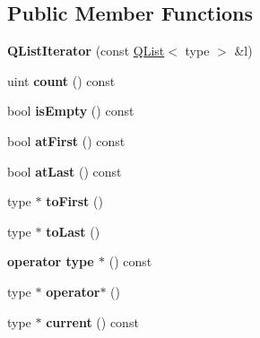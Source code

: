 \subsection*{Public Member Functions}
\begin{DoxyCompactItemize}
\item 
\mbox{\label{class_q_list_iterator_a826bd77b3505d0e9bc43971660b598e3}} 
{\bfseries Q\+List\+Iterator} (const \mbox{\hyperlink{class_q_list}{Q\+List}}$<$ type $>$ \&l)
\item 
\mbox{\label{class_q_list_iterator_a1595299ccfd5497632bd85c544b86240}} 
uint {\bfseries count} () const
\item 
\mbox{\label{class_q_list_iterator_ae4dc91934aaf9eb9ef330b2a7797bcfe}} 
bool {\bfseries is\+Empty} () const
\item 
\mbox{\label{class_q_list_iterator_a6b9fbd5a72609cea1d9abaa4cc0747a1}} 
bool {\bfseries at\+First} () const
\item 
\mbox{\label{class_q_list_iterator_a71ae9f0a1391720ca61931dd40a73c24}} 
bool {\bfseries at\+Last} () const
\item 
\mbox{\label{class_q_list_iterator_a2c526dad2cc4158567c56d18329cb6f5}} 
type $\ast$ {\bfseries to\+First} ()
\item 
\mbox{\label{class_q_list_iterator_a1470808c16e884e0a5c8a184be6f100a}} 
type $\ast$ {\bfseries to\+Last} ()
\item 
\mbox{\label{class_q_list_iterator_a3e70ab66f800982ff724f0e53302e957}} 
{\bfseries operator type $\ast$} () const
\item 
\mbox{\label{class_q_list_iterator_a8511ae825b3b3373b7c678a5ec53f826}} 
type $\ast$ {\bfseries operator$\ast$} ()
\item 
\mbox{\label{class_q_list_iterator_ab75595c03db4f2c7804200939974112f}} 
type $\ast$ {\bfseries current} () const
\item 

\end{DoxyCompactItemize}
